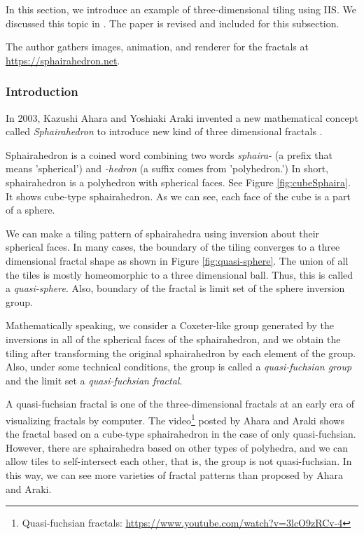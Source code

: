 In this section, we introduce an example of three-dimensional
tiling using IIS. 
We discussed this topic in \cite{bridges2018NakamuraAhara}. %
The paper is revised and included for this subsection.

The author gathers images, animation, and renderer for the fractals
at \url{https://sphairahedron.net}.

\subsubsection{Introduction}

In 2003, Kazushi Ahara and Yoshiaki Araki invented a new mathematical
concept called \textit{Sphairahedron} to introduce new kind of three
dimensional fractals \cite{ahara2003sphairahedral}.

Sphairahedron is a coined word combining two words \textit{sphaira-}
(a prefix that means 'spherical') and \textit{-hedron} (a suffix comes
from 'polyhedron.')
In short, sphairahedron is a polyhedron with spherical faces.
See Figure \ref{fig:cubeSphaira}.
It shows cube-type sphairahedron. 
As we can see, each face of the cube is a part of a sphere.

We can make a tiling pattern of sphairahedra using inversion about their
spherical faces.
In many cases, the boundary of the tiling converges to a three dimensional fractal
shape as shown in Figure \ref{fig:quasi-sphere}.
The union of all the tiles is mostly homeomorphic to a three dimensional
ball. Thus, this is called a \textit{quasi-sphere}.
Also, boundary of the fractal is limit set of the sphere inversion group.

Mathematically speaking, we consider a Coxeter-like group generated by the
inversions in all of the spherical faces of the sphairahedron, and
we obtain the tiling after transforming the original sphairahedron by
each element of the group.
Also, under some technical conditions, the group is called a
\textit{quasi-fuchsian group} and the limit set a \textit{quasi-fuchsian
fractal}.

A quasi-fuchsian fractal is one of the three-dimensional
fractals at an early era of visualizing fractals by computer.
The video\footnote{Quasi-fuchsian fractals:
\url{https://www.youtube.com/watch?v=3lcO9zRCv-4}}
posted by Ahara and Araki shows the fractal based on a cube-type
sphairahedron in the case of only quasi-fuchsian.
However, there are sphairahedra based on other types of polyhedra, and
we can allow tiles to self-intersect each other, that is, the group is
not quasi-fuchsian.
In this way, we can see more varieties of fractal patterns
than proposed by Ahara and Araki.
         
